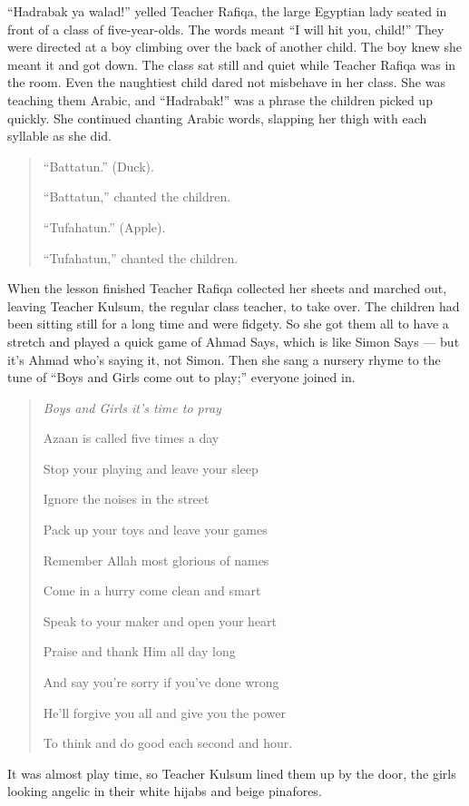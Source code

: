 \documentclass[12pt]{memoir}
\newcommand{\cor}[2]{#2} %
\begin{document}
“Hadrabak ya walad!” yelled Teacher Rafiqa,
the large Egyptian lady seated in front of a class of five-year-olds.
The words meant “I will hit you, child!”
They were directed at a boy climbing over the back of another child.
The boy knew she meant it and got down.
The class sat still and quiet while Teacher Rafiqa was in the room.
Even the naughtiest child dared not misbehave in her class.
She was teaching them Arabic, and “Hadrabak!” was a phrase
the children picked up quickly.
She continued chanting Arabic words,
slapping her thigh with each syllable as she did.

\begin{quote}
“Battatun.” (Duck).

“Battatun,” chanted the children.

“Tufahatun.” (Apple).

“Tufahatun,” chanted the children.
\end{quote}

When the lesson finished Teacher Rafiqa collected her sheets and marched out,
leaving Teacher Kulsum, the regular class teacher, to take over.
The children had been sitting still for a long time and were fidgety.
So she got them all to have a stretch and played a quick game of Ahmad Says,
which is like Simon Says — but it’s Ahmad who’s saying it, not Simon.
Then she sang a nursery rhyme to the tune of
“Boys and Girls come out to play;” everyone joined in.

\begin{quote}
\itshape
Boys and Girls \cor{its}{it’s} time to pray

Azaan is called five times a day

Stop your playing and leave your sleep

Ignore the noises in the street

Pack up your toys and leave your games

Remember Allah most glorious of names

Come in a hurry come clean and smart

Speak to your maker and open your heart

Praise and thank Him all day long

And say you’re sorry if you’ve done wrong

He’ll forgive you all and give you the power

To think and do good each second and hour.
\end{quote}

It was almost play time,
so Teacher \cor{Kuslum}{Kulsum} lined them up by the door,
the girls looking angelic in their white hijabs and beige pinafores.
\end{document}
